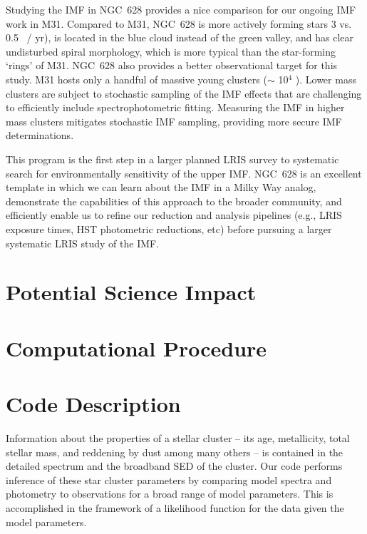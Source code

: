 \documentclass[11pt,preprint]{aastex}
\begin{document}
Studying the IMF in NGC~628 provides a nice comparison for our ongoing IMF work in M31.  Compared to M31, NGC~628 is more actively forming stars 3 vs. 0.5 \msun\ / yr), is located in the blue cloud instead of the green valley, and has clear undisturbed spiral morphology, which is more typical than the star-forming `rings' of M31.  NGC~628 also provides a better observational target for this study. M31 hosts only a handful of massive young clusters ($\sim$ 10$^4$ \msun).  Lower mass clusters are subject to stochastic sampling of the IMF effects that are challenging to efficiently include spectrophotometric fitting.  Measuring the IMF in higher mass clusters mitigates stochastic IMF sampling, providing more secure IMF determinations.

This program is the first step in a larger planned LRIS survey to systematic search for environmentally sensitivity of the upper IMF.  NGC~628 is an excellent template in which we can learn about the IMF in a Milky Way analog, demonstrate the capabilities of this approach to the broader community, and efficiently enable us to refine our reduction and analysis pipelines (e.g., LRIS exposure times, HST photometric reductions, etc) before pursuing a larger systematic LRIS study of the IMF.



\section{Potential Science Impact}



\section{Computational Procedure}


\section{Code Description}

Information about the properties of a stellar cluster -- its age,
metallicity, total stellar mass, and reddening by dust among many
others -- is contained in the detailed spectrum and the broadband SED
of the cluster. Our code performs inference of these star cluster
parameters by comparing model spectra and photometry to observations
for a broad range of model parameters.  This is accomplished in the
framework of a likelihood function for the data given the model
parameters.  
\end{document}
